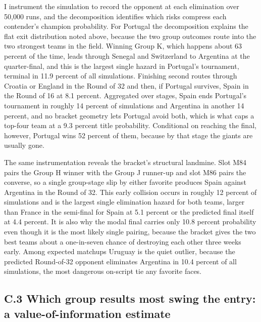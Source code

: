 \documentclass[11pt,letterpaper]{article}
\begin{document}
I instrument the simulation to record the opponent at each elimination over 50{,}000 runs, and the decomposition identifies which risks compress each contender's champion probability. For Portugal the decomposition explains the flat exit distribution noted above, because the two group outcomes route into the two strongest teams in the field. Winning Group K, which happens about 63 percent of the time, leads through Senegal and Switzerland to Argentina at the quarter-final, and this is the largest single hazard in Portugal's tournament, terminal in 11.9 percent of all simulations. Finishing second routes through Croatia or England in the Round of 32 and then, if Portugal survives, Spain in the Round of 16 at 8.1 percent. Aggregated over stages, Spain ends Portugal's tournament in roughly 14 percent of simulations and Argentina in another 14 percent, and no bracket geometry lets Portugal avoid both, which is what caps a top-four team at a 9.3 percent title probability. Conditional on reaching the final, however, Portugal wins 52 percent of them, because by that stage the giants are usually gone.

The same instrumentation reveals the bracket's structural landmine. Slot M84 pairs the Group H winner with the Group J runner-up and slot M86 pairs the converse, so a single group-stage slip by either favorite produces Spain against Argentina in the Round of 32. This early collision occurs in roughly 12 percent of simulations and is the largest single elimination hazard for both teams, larger than France in the semi-final for Spain at 5.1 percent or the predicted final itself at 4.4 percent. It is also why the modal final carries only 10.8 percent probability even though it is the most likely single pairing, because the bracket gives the two best teams about a one-in-seven chance of destroying each other three weeks early. Among expected matchups Uruguay is the quiet outlier, because the predicted Round-of-32 opponent eliminates Argentina in 10.4 percent of all simulations, the most dangerous on-script tie any favorite faces.

\subsection*{C.3 \quad Which group results most swing the entry: a value-of-information estimate}
\end{document}
